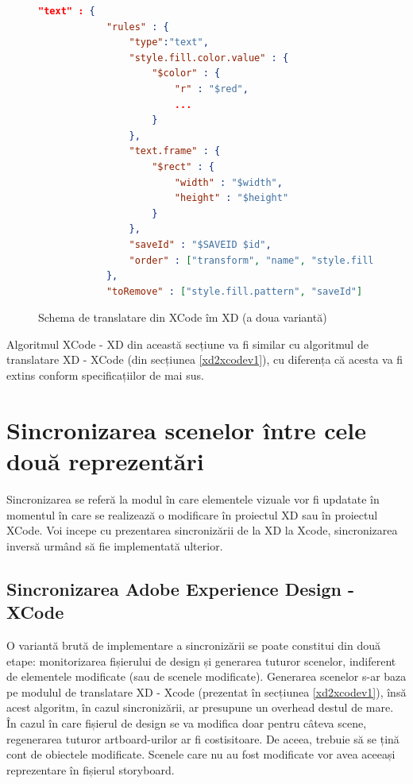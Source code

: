 \begin{figure}[!htbp]
\begin{lstlisting}[language=json,firstnumber=1]
 "text" : {
            "rules" : {
                "type":"text",
                "style.fill.color.value" : {
                    "$color" : {
                        "r" : "$red",
                        ...
                    }
                },
                "text.frame" : {
                    "$rect" : {
                        "width" : "$width",
                        "height" : "$height"
                    }
                },
                "saveId" : "$SAVEID $id",
                "order" : ["transform", "name", "style.fill.color.value", "style.font", "text.frame", "text.rawText", "meta.ux.rangedStyles", "text.paragraphs", "saveId"]
            },
            "toRemove" : ["style.fill.pattern", "saveId"] 
\end{lstlisting}
\caption{Schema de translatare din XCode îm XD (a doua variantă)} \label{fig:Schema2}
\end{figure}

Algoritmul XCode - XD din această secțiune va fi similar cu algoritmul de translatare XD - XCode (din secțiunea \ref{xd2xcodev1}), cu diferența că acesta va fi extins conform specificațiilor de mai sus.

\section{Sincronizarea scenelor între cele două reprezentări} \label{syncme}

Sincronizarea se referă la modul în care elementele vizuale vor fi updatate în momentul în care se realizează o modificare în proiectul XD sau în proiectul XCode.
Voi incepe cu prezentarea sincronizării de la XD la Xcode, sincronizarea inversă urmând să fie implementată ulterior.

\subsection{Sincronizarea Adobe Experience Design - XCode}

O variantă brută de implementare a sincronizării se poate constitui din două etape: monitorizarea fișierului de design și generarea tuturor scenelor, indiferent de elementele modificate (sau de scenele modificate). Generarea scenelor s-ar baza pe modulul de translatare XD - Xcode (prezentat în secțiunea \ref{xd2xcodev1}), însă acest algoritm, în cazul sincronizării, ar presupune un overhead destul de mare. În cazul în care fișierul de design se va modifica doar pentru câteva scene, regenerarea tuturor artboard-urilor ar fi costisitoare. De aceea, trebuie să se țină cont de obiectele modificate. Scenele care nu au fost modificate vor avea aceeași reprezentare în fișierul storyboard.

